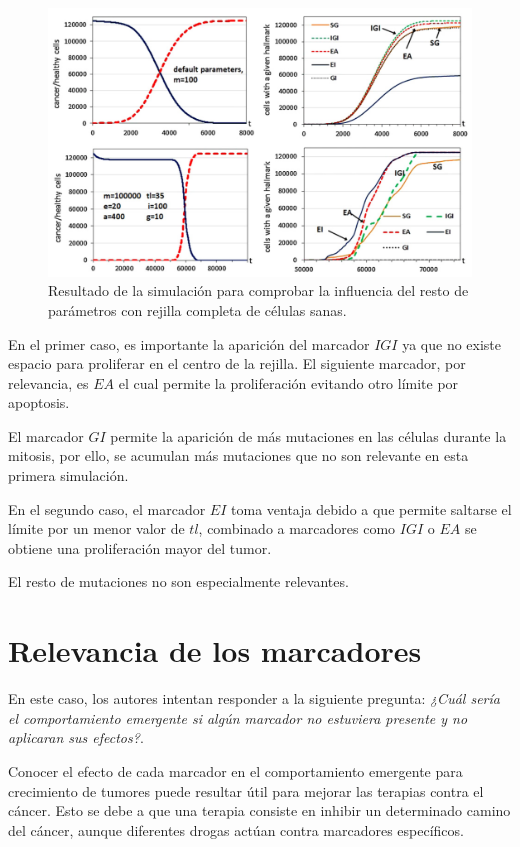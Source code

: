 \begin{figure}[h]
\centering
\includegraphics[scale=0.5]{figures/experiments/exp5}
\caption{Resultado de la simulación para comprobar la influencia del resto de parámetros con rejilla completa de células sanas.}
\label{fig:exp5}
\end{figure}

En el primer caso, es importante la aparición del marcador $IGI$ ya que no existe espacio
para proliferar en el centro de la rejilla. El siguiente marcador, por relevancia, es $EA$
el cual permite la proliferación evitando otro límite por apoptosis.

El marcador $GI$ permite la aparición de más mutaciones en las células durante la mitosis, por ello,
se acumulan más mutaciones que no son relevante en esta primera simulación.

En el segundo caso, el marcador $EI$ toma ventaja debido a que permite saltarse el límite por un
menor valor de $tl$, combinado a marcadores como $IGI$ o $EA$ se obtiene una proliferación mayor del
tumor.

El resto de mutaciones no son especialmente relevantes.

\section{Relevancia de los marcadores}

En este caso, los autores intentan responder a la siguiente pregunta: \textit{¿Cuál sería
el comportamiento emergente si algún marcador no estuviera presente y no aplicaran
sus efectos?}.

Conocer el efecto de cada marcador en el comportamiento emergente para crecimiento de tumores
puede resultar útil para mejorar las terapias contra el cáncer. Esto se debe a que una terapia
consiste en inhibir un determinado camino del cáncer, aunque diferentes drogas actúan contra marcadores específicos.

